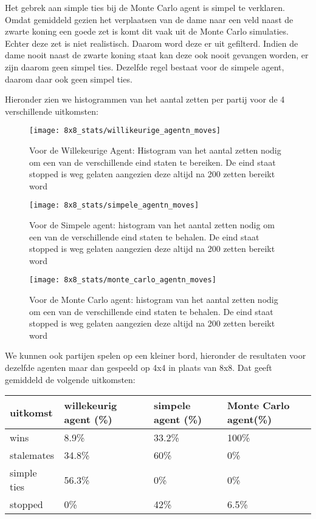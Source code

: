\documentclass[10pt]{article}
\begin{document}
Het gebrek aan simple ties bij de Monte Carlo agent is simpel te verklaren. Omdat gemiddeld gezien het verplaatsen van de dame naar een veld naast de zwarte koning een goede zet is komt dit vaak uit de Monte Carlo simulaties. Echter deze zet is niet realistisch. Daarom word deze er uit gefilterd. Indien de dame nooit naast de zwarte koning staat kan deze ook nooit gevangen worden, er zijn daarom geen simpel ties. Dezelfde regel bestaat voor de simpele agent, daarom daar ook geen simpel ties.

Hieronder zien we histogrammen van het aantal zetten per partij voor de 4 verschillende uitkomsten:

\begin{figure}[!htbp]
\begin{center}
\texttt{[image: 8x8\_stats/willikeurige\_agentn\_moves]}
\end{center}
\caption{Voor de Willekeurige Agent: Histogram van het aantal zetten nodig om een van de verschillende eind staten te bereiken. De eind staat stopped is weg gelaten aangezien deze altijd na 200 zetten bereikt word}
\end{figure}

\begin{figure}[!htbp]
\begin{center}
\texttt{[image: 8x8\_stats/simpele\_agentn\_moves]}
\end{center}
\caption{Voor de Simpele agent: histogram van het aantal zetten nodig om een van de verschillende eind staten te behalen. De eind staat stopped is weg gelaten aangezien deze altijd na 200 zetten bereikt word}
\label{hist_simple}
\end{figure}

\begin{figure}[!htbp]
\begin{center}
\texttt{[image: 8x8\_stats/monte\_carlo\_agentn\_moves]}
\end{center}
\caption{Voor de Monte Carlo agent: histogram van het aantal zetten nodig om een van de verschillende eind staten te behalen. De eind staat stopped is weg gelaten aangezien deze altijd na 200 zetten bereikt word}
\end{figure}

We kunnen ook partijen spelen op een kleiner bord, hieronder de resultaten voor dezelfde agenten maar dan gespeeld op 4x4 in plaats van 8x8. Dat geeft gemiddeld de volgende uitkomsten:

\begin{center}
\begin{tabular}{l|l|l|l}
 uitkomst & willekeurig agent (\%)& simpele agent (\%) & Monte Carlo agent(\%)\\
\hline
wins &8.9\% & 33.2\% & 100\%\\
stalemates &34.8\% & 60\% & 0\%\\
simple ties &56.3\% & 0\% & 0\%\\
stopped &0\% &42\% & 6.5\%\\
\end{tabular}
\end{center}
\end{document}
